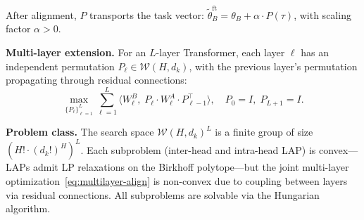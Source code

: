 After alignment, $P$ transports the task vector: $\tilde{\theta}_B^{\text{ft}} = \theta_B + \alpha \cdot P(\tau)$, with scaling factor $\alpha > 0$.

\medskip\noindent\textbf{Multi-layer extension.} For an $L$-layer Transformer, each layer $\ell$ has an independent permutation $P_\ell \in \mathcal{W}(H, d_k)$, with the previous layer's permutation propagating through residual connections:
\begin{equation}\label{eq:multilayer-align}
    \max_{\{P_\ell\}_{\ell=1}^{L}} \sum_{\ell=1}^{L} \big\langle W_\ell^{B},\; P_\ell \cdot W_\ell^{A} \cdot P_{\ell-1}^\top \big\rangle,\quad P_0 = I,\; P_{L+1} = I.
\end{equation}

\medskip\noindent\textbf{Problem class.} The search space $\mathcal{W}(H, d_k)^L$ is a finite group of size $(H! \cdot (d_k!)^H)^L$. Each subproblem (inter-head and intra-head LAP) is convex---LAPs admit LP relaxations on the Birkhoff polytope---but the joint multi-layer optimization~\eqref{eq:multilayer-align} is non-convex due to coupling between layers via residual connections. All subproblems are solvable via the Hungarian algorithm.
